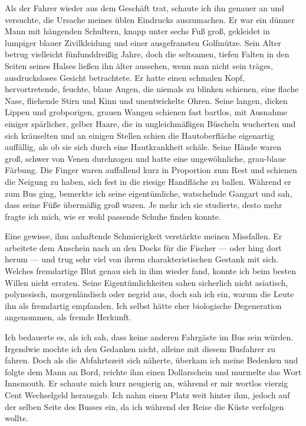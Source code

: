 Als der Fahrer wieder aus dem Geschäft trat, schaute ich ihn genauer an und versuchte, die Ursache meines üblen Eindrucks auszumachen. Er war ein dünner Mann mit hängenden Schultern, knapp unter sechs Fuß groß, gekleidet in lumpiger blauer Zivilkleidung und einer ausgefransten Golfmütze. Sein Alter betrug vielleicht fünfunddreißig Jahre, doch die seltsamen, tiefen Falten in den Seiten seines Halses ließen ihn  älter aussehen, wenn man nicht sein träges, ausdrucksloses Gesicht betrachtete. Er hatte einen schmalen Kopf, hervortretende, feuchte, blaue Augen, die niemals zu blinken schienen, eine flache Nase, fliehende Stirn und Kinn und unentwickelte Ohren. Seine langen, dicken Lippen und grobporigen, grauen Wangen schienen fast bartlos, mit Ausnahme einiger spärlicher, gelber Haare, die in ungleichmäßigen Büscheln wucherten und sich kräuselten und an einigen Stellen schien die Hautoberfläche eigenartig auffällig, als ob sie sich durch eine Hautkrankheit schäle. Seine Hände waren groß, schwer von Venen durchzogen und hatte eine ungewöhnliche, grau-blaue Färbung. Die Finger waren auffallend kurz in Proportion zum Rest und schienen die Neigung zu haben, sich fest in die riesige Handfläche zu ballen. Während er zum Bus ging, bemerkte ich seine eigentümliche, watschelnde Gangart und sah, dass seine Füße übermäßig groß waren. Je mehr ich sie studierte, desto mehr fragte ich mich, wie er wohl passende Schuhe finden konnte.

Eine gewisse, ihm anhaftende Schmierigkeit verstärkte meinen Missfallen. Er arbeitete dem Anschein nach an den Docks für die Fischer --- oder hing dort herum --- und trug sehr viel von ihrem charakteristischen Gestank mit sich. Welches fremdartige Blut genau sich in ihm wieder fand, konnte ich beim besten Willen nicht erraten. Seine Eigentümlichkeiten sahen sicherlich nicht asiatisch, polynesisch, morgenländisch oder negrid aus, doch sah ich ein, warum die Leute ihn als fremdartig empfanden. Ich selbst hätte eher biologische Degeneration angenommen, als fremde Herkunft.

Ich bedauerte es, als ich sah, dass keine anderen Fahrgäste im Bus sein würden. Irgendwie mochte ich den Gedanken nicht, alleine mit diesem Busfahrer zu fahren. Doch als die Abfahrtszeit sich näherte, überkam ich meine Bedenken und folgte dem Mann an Bord, reichte ihm einen Dollarschein und murmelte das Wort \glqq Innsmouth\grqq. Er schaute mich kurz neugierig an, während er mir wortlos vierzig Cent Wechselgeld herausgab. Ich nahm einen Platz weit hinter ihm, jedoch auf der selben Seite des Busses ein, da ich während der Reise die Küste verfolgen wollte.

